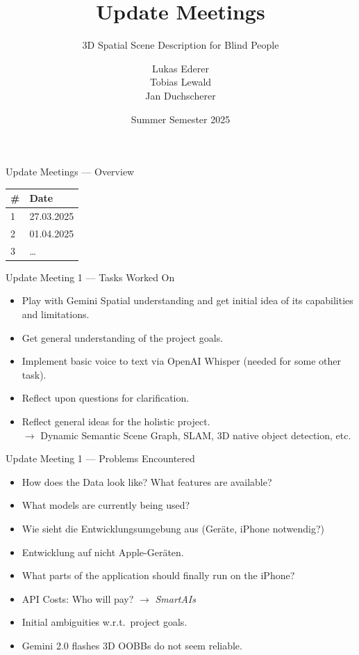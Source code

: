 \documentclass[aspectratio=169,xcolor=dvipsnames]{beamer}
\title{Update Meetings}
\subtitle{3D Spatial Scene Description for Blind People}
\author{Lukas Ederer \\ Tobias Lewald \\ Jan Duchscherer}
\institute{Fakult\"at f\"ur Informatik und Mathematik\\Hochschule M\"unchen}
\date{Summer Semester 2025}
\newcommand{\framedate}[1]{\def\currentframedate{#1}}
\begin{document}
\begin{frame}
    \titlepage
\end{frame}

\framedate{Overview - Summer 2025}
\begin{frame}{Update Meetings --- Overview}
\begin{table}[]
\centering
\begin{tabular}{ll}
\toprule
\textbf{\#} & \textbf{Date} \\
\midrule
1 & 27.03.2025 \\
2 & 01.04.2025 \\
3 & \ldots \\
\bottomrule
\end{tabular}
\end{table}
\end{frame}

\framedate{27.03.2025}
\begin{frame}{Update Meeting 1 --- Tasks Worked On}
\begin{itemize}
  \item Play with Gemini Spatial understanding and get initial idea of its capabilities and limitations.
  \item Get general understanding of the project goals.
  \item Implement basic voice to text via OpenAI Whisper (needed for some other task).
  \item Reflect upon questions for clarification.
  \item Reflect general ideas for the holistic project.\\
  \( \rightarrow \) Dynamic Semantic Scene Graph, SLAM, 3D native object detection, etc.
\end{itemize}
\end{frame}

\framedate{27.03.2025}
\begin{frame}{Update Meeting 1 --- Problems Encountered}
\begin{itemize}
  \item How does the Data look like? What features are available?
  \item What models are currently being used?
  \item Wie sieht die Entwicklungsumgebung aus (Ger\"ate, iPhone notwendig?)
  \item Entwicklung auf nicht Apple-Ger\"aten.
  \item What parts of the application should finally run on the iPhone?
  \item API Costs: Who will pay? \(\rightarrow \) \textit{SmartAIs}
  \item Initial ambiguities w.r.t.\ project goals.
  \item Gemini 2.0 flashes 3D OOBBs do not seem reliable.
\end{itemize}
\end{frame}
\end{document}

